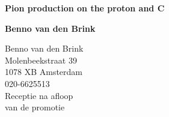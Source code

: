 \thispagestyle {empty}

\begin{center}
{\LARGE\bf Pion production on the proton and C}
\vfill
\centerline{}
\vfill
\hfill {\Large\bf Benno van den Brink}
\end{center}
\newpage

\newpage
\evensidemargin 1.5cm
\oddsidemargin 2.5cm
\newpage

\hspace{1cm}
\begin{center}
\large
\noindent
{\sc Benno van den Brink}\\[\baselineskip]
Molenbeekstraat 39\\
1078 XB Amsterdam\\
020-6625513\\
\vfill
Receptie na afloop\\
van de promotie
\end{center}
\newpage


